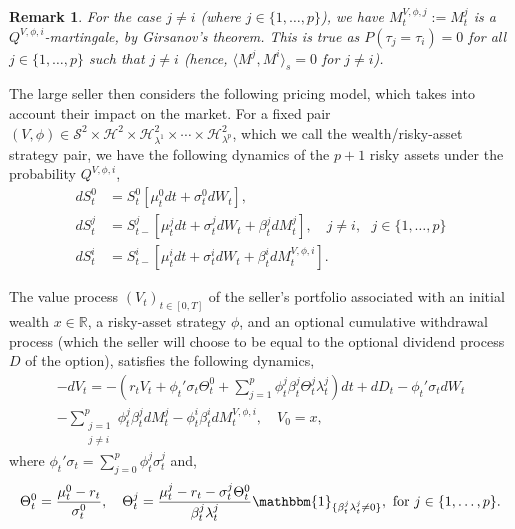 \documentclass[11pt,a4paper]{article}
\numberwithin{equation}{section}
\theoremstyle{newPlain}
\theoremstyle{newDefinition}
\theoremstyle{newRemark}
\newtheorem{remark}[theorem]{Remark}
\begin{document}
\begin{remark}\label{remark:3_Girsanov}
    For the case $j\ne i$ (where $j\in\{1,\ldots,p\}$), we have $M_t^{V,\phi,j}:= M_t^j$ is a $Q^{V,\phi,i}$-martingale,  by Girsanov's theorem. This is true as  $P(\tau_j = \tau_i)=0$ for all $j\in\{1,\ldots,p\}$ such that $j\ne i$ (hence,  $\langle M^j,M^i\rangle_s=0$ for $j\ne i$). %
\end{remark}

The large seller then considers the following pricing model, which takes into account their impact on the market. For a fixed pair $(V,\phi)\in\mathcal{S}^2\times\mathcal{H}^2\times\mathcal{H}_{\lambda^1}^2\times\cdots\times\mathcal{H}_{\lambda^p}^2$, which we call the wealth/risky-asset strategy pair, we have the following dynamics of the $p+1$ risky assets under the probability $Q^{V,\phi,i}$,
\begin{align*}
    dS_t^0 &= S_t^0[\mu_t^0dt + \sigma_t^0dW_t],\\
    dS_t^j &= S_{t-}^j[\mu_t^jdt+\sigma_t^jdW_t+\beta_t^jdM_t^j],\quad j\ne i,\text{ }j\in\{1,\ldots,p\}\\
    dS_t^i &=  S_{t-}^i[\mu_t^idt+\sigma_t^idW_t + \beta_t^idM_t^{V,\phi,i}].
\end{align*}

The value process $(V_t)_{t\in[0,T]}$ of the seller's portfolio associated with an initial wealth $x\in\mathbb{R}$, a risky-asset strategy $\phi$, and  an optional cumulative withdrawal process (which  the seller will choose to be equal to the optional dividend process $D$ of the option), satisfies the following dynamics,
\begin{multline}\label{eq:3_ValueProcess1}
    -dV_t = -\left(r_tV_t +\phi_t'\sigma_t\Theta_t^0 + \sum_{j=1}^p\phi_t^j\beta_t^j\Theta_t^j\lambda_t^j\right)dt + dD_t - \phi_t'\sigma_tdW_t \\- \sum_{\substack{j=1\\j\ne i}}^p\phi_t^j\beta_t^jdM_t^j - \phi_t^i\beta_t^idM_t^{V,\phi,i},\quad V_0=x,
\end{multline}
where $\phi_t'\sigma_t = \sum_{j=0}^p\phi_t^j\sigma_t^j$ and,
\begin{equation*}
    \Theta_t^0 = \frac{\mu_t^0-r_t}{\sigma_t^0},\quad\Theta_t^j = \frac{\mu_t^j-r_t-\sigma_t^j\Theta_t^0}{\beta_t^j\lambda_t^j}\mathbbm{1}_{\{\beta_t^j\lambda_t^j\ne0\}},\text{  for }j\in\{1,\ldots,p\}.
\end{equation*}
\end{document}
